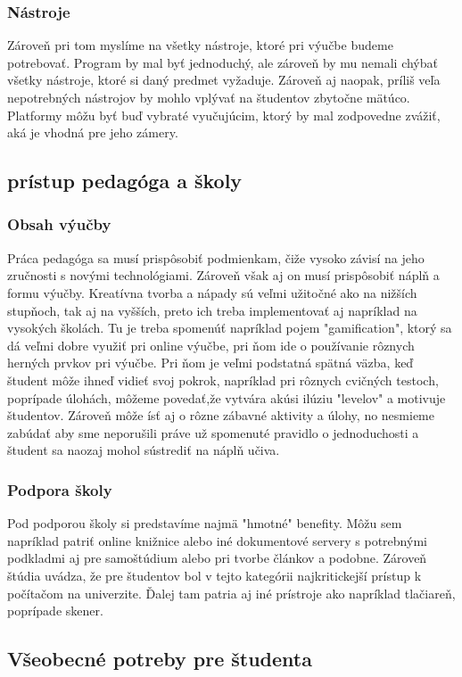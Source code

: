 \documentclass[12pt]{article}
\begin{document}
\subsubsection{Nástroje}  
Zároveň pri tom myslíme na všetky nástroje, ktoré pri výučbe budeme potrebovať. Program by mal byť jednoduchý, ale zároveň by mu nemali chýbať všetky nástroje, ktoré si daný predmet vyžaduje. Zároveň aj naopak, príliš veľa nepotrebných nástrojov by mohlo vplývať na študentov zbytočne mätúco. Platformy môžu byť buď vybraté vyučujúcim, ktorý by mal zodpovedne zvážiť, aká je vhodná pre jeho zámery.  
\subsection{prístup pedagóga a školy}
\subsubsection{Obsah výučby}
Práca pedagóga sa musí prispôsobiť podmienkam, čiže vysoko závisí na jeho zručnosti s novými technológiami. Zároveň však aj on musí prispôsobiť náplň a formu výučby. Kreatívna tvorba a nápady sú veľmi užitočné ako na nižších stupňoch, tak aj na vyšších, preto ich treba implementovať aj napríklad na vysokých školách. Tu je treba spomenúť napríklad pojem "gamification", ktorý sa dá veľmi dobre využiť pri online výučbe, pri ňom ide o používanie rôznych herných prvkov pri výučbe. Pri ňom je veľmi podstatná spätná väzba, keď študent môže ihneď vidieť svoj pokrok, napríklad pri rôznych cvičných testoch, poprípade úlohách, môžeme povedať,že vytvára akúsi ilúziu "levelov" a motivuje študentov. Zároveň môže ísť aj o rôzne zábavné aktivity a úlohy, no nesmieme zabúdať aby sme neporušili práve už spomenuté pravidlo o jednoduchosti a študent sa naozaj mohol sústrediť na náplň učiva.  \cite{gamif} 
\subsubsection{Podpora školy}
Pod podporou školy si predstavíme najmä "hmotné" benefity. Môžu sem napríklad patriť online knižnice alebo iné dokumentové servery s potrebnými podkladmi aj pre samoštúdium alebo pri tvorbe článkov a podobne. Zároveň štúdia uvádza, že pre študentov bol v tejto kategórii najkritickejší prístup k počítačom na univerzite. Ďalej tam patria aj iné prístroje ako napríklad tlačiareň, poprípade skener. \cite{2}
\subsection{Všeobecné potreby pre študenta}



\end{document}
